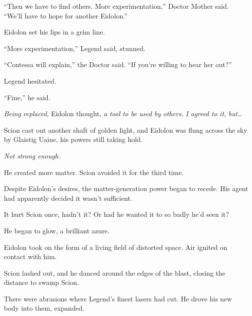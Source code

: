 ``Then we have to find others.  More experimentation,'' Doctor Mother said.  ``We'll have to hope for another Eidolon.''



Eidolon set his lips in a grim line.



``More experimentation,'' Legend said, stunned.



``Contessa will explain,'' the Doctor said.  ``If you're willing to hear her out?''



Legend hesitated.



``Fine,'' he said.



\emph{Being replaced,} Eidolon thought, \emph{a tool to be used by others.  I agreed to it, but\ldots}



\blacksquare



Scion cast out another shaft of golden light, and Eidolon was flung across the sky by Glaistig Uaine, his powers still taking hold.



\emph{Not strong enough}.



He created more matter.  Scion avoided it for the third time.



Despite Eidolon's desires, the matter-generation power began to recede.  His agent had apparently decided it wasn't sufficient.



It hurt Scion once, hadn't it?  Or had he wanted it to so badly he'd seen it?



He began to glow, a brilliant azure.



Eidolon took on the form of a living field of distorted space.  Air ignited on contact with him.



Scion lashed out, and he danced around the edges of the blast, closing the distance to swamp Scion.



There were abrasions where Legend's finest lasers had cut.  He drove his new body into them, expanded.



